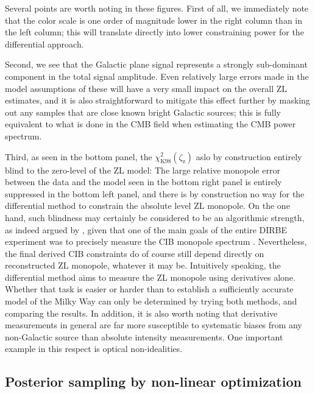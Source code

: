\documentclass[twocolumn]{aa}
\begin{document}
Several points are worth noting in these figures. First of all, we
immediately note that the color scale is one order of magnitude lower
in the right column than in the left column; this will translate
directly into lower constraining power for the differential
approach.

Second, we see that the Galactic plane signal represents a strongly
sub-dominant component in the total signal amplitude. Even relatively
large errors made in the model assumptions of these will have a very
small impact on the overall ZL estimates, and it is also
straightforward to mitigate this effect further by masking out any
samples that are close known bright Galactic sources; this is fully
equivalent to what is done in the CMB field when estimating the CMB
power spectrum.

Third, as seen in the bottom panel, the $\chi^2_{\mathrm{K98}}
(\zeta_{\mathrm{z}})$ aslo by construction entirely blind to the
zero-level of the ZL model: The large relative monopole error between
the data and the model seen in the bottom right panel is entirely
suppressed in the bottom left panel, and there is by construction no
way for the differential method to constrain the absolute level ZL
monopole. On the one hand, such blindness may certainly be considered
to be an algorithmic strength, as indeed argued by
\citet{Kelsall1998}, given that one of the main goals of the entire
DIRBE experiment was to precisely measure the CIB monopole spectrum
\citep{hauser1998}. Nevertheless, the final derived CIB constraints do
of course still depend directly on reconstructed ZL monopole, whatever
it may be. Intuitively speaking, the differential method aims to
measure the ZL monopole using derivatives alone. Whether that task is
easier or harder than to establish a sufficiently accurate model of
the Milky Way can only be determined by trying both methods, and
comparing the results. In addition, it is also worth noting that
derivative measurements in general are far more susceptible to
systematic biases from any non-Galactic source than absolute intensity
measurements. One important example in this respect is optical
non-idealities.



\subsection{Posterior sampling by non-linear optimization}
\label{sec:nonlin}
\end{document}
